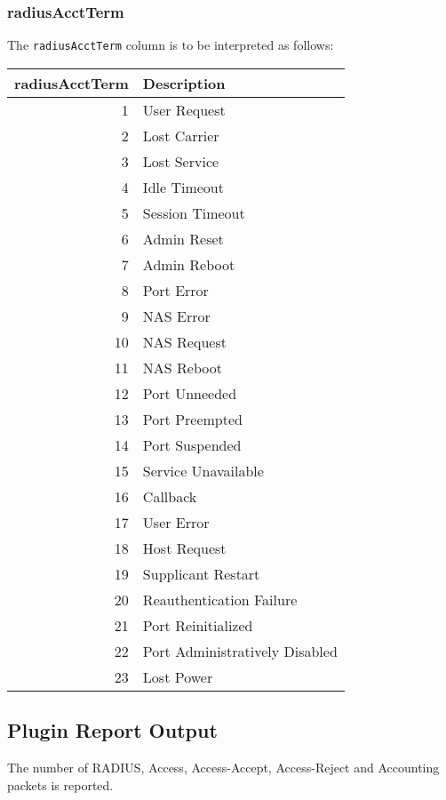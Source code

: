 \documentclass[documentation]{subfiles}
\begin{document}
\subsubsection{radiusAcctTerm}\label{radiusAcctTerm}
The {\tt radiusAcctTerm} column is to be interpreted as follows:
\begin{longtable}{rl}
    \toprule
    {\bf radiusAcctTerm} & {\bf Description}\\
    \midrule\endhead%
     1 & User Request\\
     2 & Lost Carrier\\
     3 & Lost Service\\
     4 & Idle Timeout\\
     5 & Session Timeout\\
     6 & Admin Reset\\
     7 & Admin Reboot\\
     8 & Port Error\\
     9 & NAS Error\\
    10 & NAS Request\\
    11 & NAS Reboot\\
    12 & Port Unneeded\\
    13 & Port Preempted\\
    14 & Port Suspended\\
    15 & Service Unavailable\\
    16 & Callback\\
    17 & User Error\\
    18 & Host Request\\
    19 & Supplicant Restart\\
    20 & Reauthentication Failure\\
    21 & Port Reinitialized\\
    22 & Port Administratively Disabled\\
    23 & Lost Power\\
    \bottomrule
\end{longtable}


\subsection{Plugin Report Output}
The number of RADIUS, Access, Access-Accept, Access-Reject and Accounting packets is reported.
\end{document}
